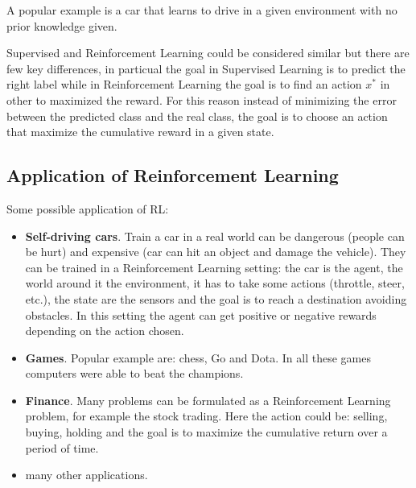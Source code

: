 \documentclass[14pt]{extarticle}
\begin{document}
\begin{flushleft}
\begin{itemize}
A popular example is a car that learns to drive in a given environment with no prior knowledge given.
\end{itemize}
Supervised and Reinforcement Learning could be considered similar but there are few key differences, in particual the goal in Supervised Learning is to predict the right label while in Reinforcement Learning the goal is to find an action $x^*$ in other to maximized the reward. For this reason instead of minimizing the error between the predicted class and the real class, the goal is to choose an action that maximize the cumulative reward in a given state.

\subsection{Application of Reinforcement Learning}
Some possible application of RL:
\begin{itemize}
\item \textbf{Self-driving cars}. Train a car in a real world can be dangerous (people can be hurt) and expensive (car can hit an object and damage the vehicle). They can be trained in a Reinforcement Learning setting: the car is the agent, the world around it the environment, it has to take some actions (throttle, steer, etc.), the state are the sensors and the goal is to reach a destination avoiding obstacles. In this setting the agent can get positive or negative rewards depending on the action chosen.
\item \textbf{Games}. Popular example are: chess, Go and Dota. In all these games computers were able to beat the champions.
\item \textbf{Finance}. Many problems can be formulated as a Reinforcement Learning  problem, for example the stock trading. Here the action could be: selling, buying, holding and the goal is to maximize the  cumulative return over a period of time.
\item many other applications\cite{RLapplications}.
\end{itemize}


\end{flushleft}
\end{document}
